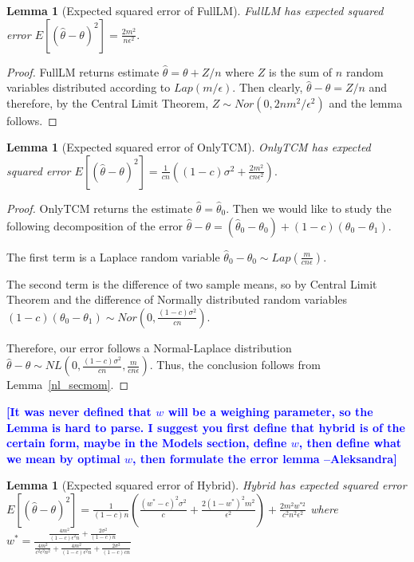 \documentclass{article}
\newcommand{\ak}[1]{\textcolor{blue}{\bf\small [#1 --Aleksandra]}}
\theoremstyle{plain}
\newtheorem{lem}[thm]{Lemma}
\begin{document}
\begin{lem}[Expected squared error of FullLM]
\label{MSE_FullLM}
FullLM has expected squared error
$E[(\hat{\theta} - \theta)^2] = \frac{2m^2}{n\epsilon^2}.$
\end{lem}
\begin{proof}
FullLM returns estimate $\hat{\theta} = \theta + Z/n$ where $Z$ is the sum of $n$ random variables distributed according to $Lap(m/\epsilon)$. Then clearly, $\hat{\theta} - \theta = Z/n$ and therefore, by the Central Limit Theorem, $Z \sim Nor(0, 2nm^2/\epsilon^2)$ and the lemma follows. 
\end{proof}

\begin{lem}[Expected squared error of OnlyTCM]
\label{MSE_OnlyTCM}
OnlyTCM has expected squared error
$E[(\hat{\theta} - \theta)^2] = \frac{1}{cn}\left((1-c)\sigma^2 + \frac{2m^2}{cn \epsilon^2 }\right).$
\end{lem}
\begin{proof}
OnlyTCM returns the estimate $\hat{\theta} = \hat{\theta}_0$. Then we would like to study the following decomposition of the error
$\hat{\theta} - \theta = (\hat{\theta}_0 - \theta_0) + (1-c)(\theta_0 - \theta_1).$

The first term is a Laplace random variable
$\hat{\theta}_0 - \theta_0 \sim Lap\left(\frac{m}{cn\epsilon}\right).$

The second term is the difference of two sample means, so by Central Limit Theorem and the difference of Normally distributed random variables
$(1-c)(\theta_0 - \theta_1) \sim Nor\left(0, \frac{(1-c)\sigma^2}{cn}\right).$

Therefore, our error follows a Normal-Laplace distribution
$\hat{\theta} - \theta \sim NL\left(0, \frac{(1-c)\sigma^2}{cn}, \frac{m}{cn\epsilon} \right).$
Thus, the conclusion follows from Lemma~\ref{nl_secmom}.
\end{proof}

\ak{It was never defined that $w$ will be a weighing parameter, so the Lemma is hard to parse. I suggest you first define that hybrid is of the certain form, maybe in the Models section, define $w$, then define what we mean by optimal $w$, then formulate the error lemma}
\begin{lem}[Expected squared error of Hybrid]
Hybrid has expected squared error 
$E[(\hat{\theta} - \theta)^2] = \frac{1}{(1-c)n}\left(\frac{(w^*-c)^2\sigma^2}{c} + \frac{2(1-w^*)^2 m^2}{\epsilon^2}\right) + \frac{2m^2w^{*2}}{c^2n^2\epsilon^2}$
where
$w^* = \frac{\frac{4 m^2}{(1-c) \epsilon^2 n}+\frac{2 \sigma^2}{(1-c) n}}{\frac{4 m^2}{c^2 \epsilon^2 n^2}+\frac{4 m^2}{(1-c) \epsilon^2 n}+\frac{2 \sigma^2}{(1-c) c n}}$
\end{lem}
\end{document}
